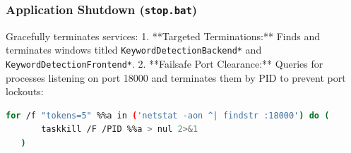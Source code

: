 \subsubsection{Application Shutdown (\texttt{stop.bat})}
Gracefully terminates services:
1. **Targeted Terminations:** Finds and terminates windows titled \texttt{KeywordDetectionBackend*} and \texttt{KeywordDetectionFrontend*}.
2. **Failsafe Port Clearance:** Queries for processes listening on port 18000 and terminates them by PID to prevent port lockouts:
   \begin{lstlisting}[language=bash]
   for /f "tokens=5" %%a in ('netstat -aon ^| findstr :18000') do (
       taskkill /F /PID %%a > nul 2>&1
   )
   \end{lstlisting}

